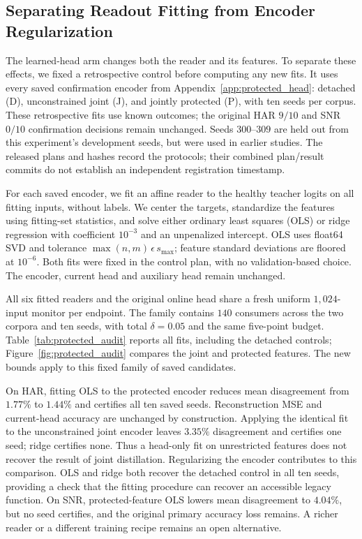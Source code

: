 \subsection{Separating Readout Fitting from Encoder Regularization}\label{app:protected_audit}

The learned-head arm changes both the reader and its features. To separate
these effects, we fixed a retrospective control before computing any new fits.
It uses every saved confirmation encoder from Appendix~\ref{app:protected_head}:
detached (D), unconstrained joint (J), and jointly protected (P), with ten seeds
per corpus. These retrospective fits use known outcomes; the original HAR $9/10$ and
SNR $0/10$ confirmation decisions remain unchanged. Seeds $300$--$309$ are held out
from this experiment's development seeds, but were used in earlier studies.
The released plans and hashes record the protocols; their combined plan/result
commits do not establish an independent registration timestamp.

For each saved encoder, we fit an affine reader to the healthy teacher logits
on all fitting inputs, without labels. We center the targets, standardize the
features using fitting-set statistics, and solve either ordinary least squares
(OLS) or ridge regression with coefficient $10^{-3}$ and an unpenalized
intercept. OLS uses float64 SVD and tolerance
$\max(n,m)\,\epsilon\,s_{\max}$; feature standard deviations are floored at
$10^{-6}$. Both fits were fixed in the control plan, with no validation-based
choice. The encoder, current head and auxiliary head remain unchanged.

All six fitted readers and the original online head share a fresh uniform
$1{,}024$-input monitor per endpoint. The family contains $140$ consumers across
the two corpora and ten seeds, with total $\delta=0.05$ and the same five-point
budget. Table~\ref{tab:protected_audit} reports all fits, including the detached
controls; Figure~\ref{fig:protected_audit} compares the joint and protected
features. The new bounds apply to this fixed family of saved candidates.



On HAR, fitting OLS to the protected encoder reduces mean disagreement from
$1.77\%$ to $1.44\%$ and certifies all ten saved seeds. Reconstruction MSE and
current-head accuracy are unchanged by construction. Applying the identical
fit to the unconstrained joint encoder leaves $3.35\%$ disagreement and
certifies one seed; ridge certifies none. Thus a head-only fit on unrestricted
features does not recover the result of joint distillation. Regularizing the
encoder contributes to this comparison. OLS and ridge both recover the detached
control in all ten seeds, providing a check that the fitting procedure can
recover an accessible legacy function. On SNR, protected-feature OLS lowers
mean disagreement to $4.04\%$, but no seed certifies, and the original primary
accuracy loss remains. A richer reader or a different training recipe remains an open alternative.

